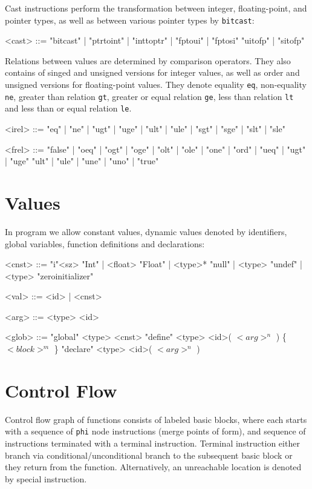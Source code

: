 \noindent
Cast instructions perform the transformation between integer, floating-point,
and pointer types, as well as between various pointer types by \texttt{bitcast}:

\begin{grammar}
<cast>  ::= "bitcast" | "ptrtoint" | "inttoptr" | "fptoui" | "fptosi" \alt
           "uitofp"  | "sitofp"
\end{grammar}

\noindent
Relations between \llvm values are determined by comparison operators. They
also contains of singed and unsigned versions for integer values, as well as
order and unsigned versions for floating-point values. They denote equality
\texttt{eq}, non-equality \texttt{ne}, greater than relation \texttt{gt},
greater or equal relation \texttt{ge}, less than relation \texttt{lt} and less
than or equal relation \texttt{le}.

\begin{grammar}
<irel> ::= "eq" | "ne" | "ugt" | "uge" | "ult" | "ule" | "sgt" | "sge" | "slt" | "sle"

<frel> ::= "false" | "oeq" | "ogt" | "oge" | "olt" | "ole" | "one" | "ord" | "ueq" | "ugt" | "uge"
    \alt "ult" | "ule" | "une" | "uno" | "true"
\end{grammar}

\section*{Values}

In \llvm program we allow constant values, dynamic values denoted by
identifiers, global variables, function definitions and declarations:

\begin{grammar}
<cnst> ::= "i"<sz> "Int" | <float> "Float" | <type>* "null" | <type> "undef" |
    \alt <type> "zeroinitializer"

<val> ::= <id> | <cnst>

<arg> ::= <type> <id>

<glob> ::= "global" <type> <cnst>
    \alt "define" <type> <id>( $<arg>^n$ ) \{ $<block>^m$ \}
    \alt "declare" <type> <id>( $<arg>^n$ )
\end{grammar}

\section*{Control Flow}

Control flow graph of \llvm functions consists of labeled basic blocks, where
each starts with a sequence of \texttt{phi} node instructions (merge points of \ssa
form), and sequence of instructions terminated with a terminal instruction.
Terminal instruction either branch via conditional/uncon\-di\-tio\-nal branch to the
subsequent basic block or they return from the function. Alternatively, an
unreachable location is denoted by special instruction.

